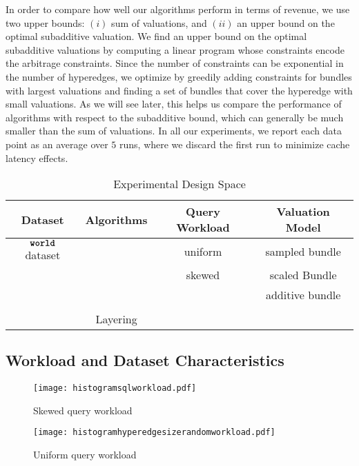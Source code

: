 In order to compare how well our algorithms perform in terms of revenue, we use two upper 
bounds: $(i)$ sum of valuations, and $(ii)$ an upper bound on the optimal subadditive valuation. We find an upper bound on the optimal subadditive valuations by computing a linear program whose constraints encode the arbitrage constraints. Since the number of constraints can be exponential in the number of hyperedges, we optimize by greedily adding constraints for bundles with largest valuations and finding a set of bundles that cover the hyperedge with small valuations. As we will see later, this helps us compare the performance of algorithms with respect to the subadditive bound, which can
generally be much smaller than the sum of valuations. 
In all our experiments, we report each data point as an average over $5$ runs, where we discard the first run to minimize cache latency effects. 

\begin{table*} \centering
	\def\arraystretch{1.35}%
	\begin{tabular}{c|c|c|c}
		\toprule
		\textbf{Dataset} & \textbf{Algorithms} & \textbf{Query Workload} & \textbf{Valuation Model}\\ \midrule
		$\texttt{\bfseries world}$ dataset & \ubp & uniform & sampled bundle  \\ 
		& \uip & skewed & scaled Bundle  \\ 
		& \lpip &  & additive bundle  \\ 
		& \cip & &  \\
		& Layering &  &  \\
		\bottomrule
	\end{tabular}
	\caption{Experimental Design Space}
	\label{table:experiments}
\end{table*}

\subsection{Workload and Dataset Characteristics}

\begin{figure}[!h]
	\begin{minipage}[t]{0.49\linewidth} 
		\centering
		\texttt{[image: histogramsqlworkload.pdf]}
		\caption{Skewed query workload} \label{fig:histogramrealqueries}
	\end{minipage}       	
	\begin{minipage}[t]{0.47\linewidth}
		\centering
		\texttt{[image: histogramhyperedgesizerandomworkload.pdf]}
		\caption{Uniform query workload} \label{fig:histogramrandom}
	\end{minipage} 
\end{figure}  



